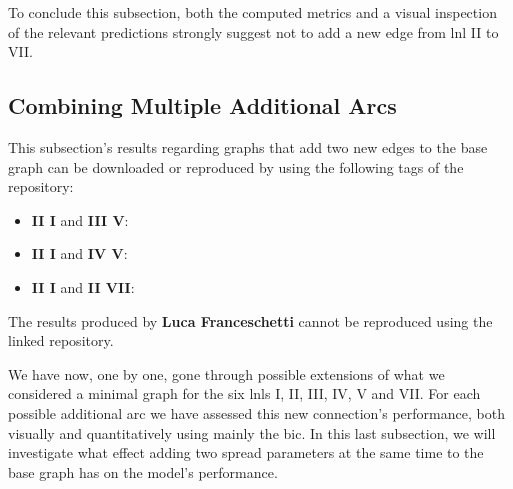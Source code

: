 \documentclass[\relativeRoot/main.tex]{subfiles}
\begin{document}
To conclude this subsection, both the computed metrics and a visual inspection of the relevant predictions strongly suggest not to add a new edge from \gls{lnl} II to VII.

\subsection{Combining Multiple Additional Arcs}
\label{subsec:graph:extended:multiple}



\begin{tcolorbox}[title=\faIcon{recycle} Reproducibility, parbox=false]
    This subsection's results regarding graphs that add two new edges to the base graph can be downloaded or reproduced by using the following tags of the  repository:

    \begin{itemize}
        \item \textbf{II  I} and \textbf{III  V}: 
        \item \textbf{II  I} and \textbf{IV  V}: 
        \item \textbf{II  I} and \textbf{II  VII}: 
    \end{itemize}

    The results produced by  \textbf{Luca Franceschetti} \cite{franceschetti_comparison_2022} cannot be reproduced using the linked repository.
\end{tcolorbox}

We have now, one by one, gone through possible extensions of what we considered a minimal graph for the six \glspl{lnl} I, II, III, IV, V and VII. For each possible additional arc we have assessed this new connection's performance, both visually and quantitatively using mainly the \acrlong{bic}. In this last subsection, we will investigate what effect adding two spread parameters at the same time to the base graph has on the model's performance.
\end{document}
